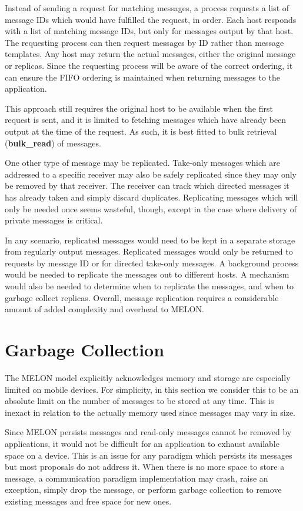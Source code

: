 Instead of sending a request for matching messages, a process requests a list of message IDs which would have fulfilled the request, in order. Each host responds with a list of matching message IDs, but only for messages output by that host. The requesting process can then request messages by ID rather than message templates. Any host may return the actual messages, either the original message or replicas. Since the requesting process will be aware of the correct ordering, it can ensure the FIFO ordering is maintained when returning messages to the application.

This approach still requires the original host to be available when the first request is sent, and it is limited to fetching messages which have already been output at the time of the request. As such, it is best fitted to bulk retrieval (\textbf{bulk\_read}) of messages.

One other type of message may be replicated. Take-only messages which are addressed to a specific receiver may also be safely replicated since they may only be removed by that receiver. The receiver can track which directed messages it has already taken and simply discard duplicates. Replicating messages which will only be needed once seems wasteful, though, except in the case where delivery of private messages is critical.

In any scenario, replicated messages would need to be kept in a separate storage from regularly output messages. Replicated messages would only be returned to requests by message ID or for directed take-only messages. A background process would be needed to replicate the messages out to different hosts. A mechanism would also be needed to determine when to replicate the messages, and when to garbage collect replicas. Overall, message replication requires a considerable amount of added complexity and overhead to MELON.

\section{Garbage Collection}

The MELON model explicitly acknowledges memory and storage are especially limited on mobile devices. For simplicity, in this section we consider this to be an absolute limit on the number of messages to be stored at any time. This is inexact in relation to the actually memory used since messages may vary in size.

Since MELON persists messages and read-only messages cannot be removed by applications, it would not be difficult for an application to exhaust available space on a device. This is an issue for any paradigm which persists its messages but most proposals do not address it. When there is no more space to store a message, a communication paradigm implementation may crash, raise an exception, simply drop the message, or perform garbage collection to remove existing messages and free space for new ones.

